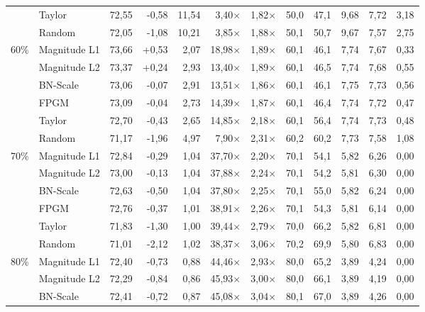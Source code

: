 \begin{table}[H]
{{\begin{tabular}{c l rr rrr rr rrr}
     & Taylor & 72,55 & -0,58 & 11,54 & 3,40$\times$ & 1,82$\times$ & 50,0 & 47,1 & 9,68 & 7,72 & 3,18 \\
     & Random & 72,05 & -1,08 & 10,21 & 3,85$\times$ & 1,88$\times$ & 50,1 & 50,7 & 9,67 & 7,57 & 2,75 \\
    \midrule
    \multirow{6}{*}{60\%} & Magnitude L1 & 73,66 & +0,53 & 2,07 & 18,98$\times$ & 1,89$\times$ & 60,1 & 46,1 & 7,74 & 7,67 & 0,33 \\
     & Magnitude L2 & 73,37 & +0,24 & 2,93 & 13,40$\times$ & 1,89$\times$ & 60,1 & 46,5 & 7,74 & 7,68 & 0,55 \\
     & BN-Scale & 73,06 & -0,07 & 2,91 & 13,51$\times$ & 1,86$\times$ & 60,1 & 46,1 & 7,75 & 7,73 & 0,56 \\
     & FPGM & 73,09 & -0,04 & 2,73 & 14,39$\times$ & 1,87$\times$ & 60,1 & 46,4 & 7,74 & 7,72 & 0,47 \\
     & Taylor & 72,70 & -0,43 & 2,65 & 14,85$\times$ & 2,18$\times$ & 60,1 & 56,4 & 7,74 & 7,73 & 0,48 \\
     & Random & 71,17 & -1,96 & 4,97 & 7,90$\times$ & 2,31$\times$ & 60,2 & 60,2 & 7,73 & 7,58 & 1,08 \\
    \midrule
    \multirow{6}{*}{70\%} & Magnitude L1 & 72,84 & -0,29 & 1,04 & 37,70$\times$ & 2,20$\times$ & 70,1 & 54,1 & 5,82 & 6,26 & 0,00 \\
     & Magnitude L2 & 73,00 & -0,13 & 1,04 & 37,88$\times$ & 2,24$\times$ & 70,1 & 54,2 & 5,81 & 6,30 & 0,00 \\
     & BN-Scale & 72,63 & -0,50 & 1,04 & 37,80$\times$ & 2,25$\times$ & 70,1 & 55,0 & 5,82 & 6,24 & 0,00 \\
     & FPGM & 72,76 & -0,37 & 1,01 & 38,91$\times$ & 2,26$\times$ & 70,1 & 54,3 & 5,81 & 6,14 & 0,00 \\
     & Taylor & 71,83 & -1,30 & 1,00 & 39,44$\times$ & 2,79$\times$ & 70,0 & 66,2 & 5,82 & 6,81 & 0,00 \\
     & Random & 71,01 & -2,12 & 1,02 & 38,37$\times$ & 3,06$\times$ & 70,2 & 69,9 & 5,80 & 6,83 & 0,00 \\
    \midrule
    \multirow{6}{*}{80\%} & Magnitude L1 & 72,40 & -0,73 & 0,88 & 44,46$\times$ & 2,93$\times$ & 80,0 & 65,2 & 3,89 & 4,24 & 0,00 \\
     & Magnitude L2 & 72,29 & -0,84 & 0,86 & 45,93$\times$ & 3,00$\times$ & 80,0 & 66,1 & 3,89 & 4,19 & 0,00 \\
     & BN-Scale & 72,41 & -0,72 & 0,87 & 45,08$\times$ & 3,04$\times$ & 80,1 & 67,0 & 3,89 & 4,26 & 0,00 \\

\end{tabular}}}
\end{table}
